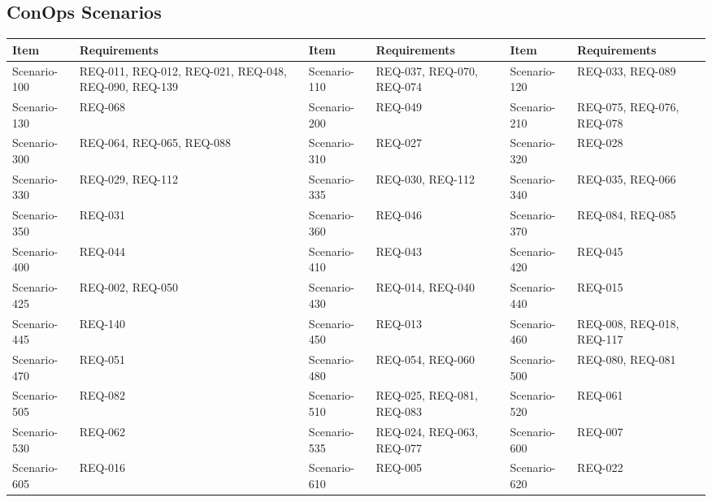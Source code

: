 \documentclass[11pt,a4paper]{article}
\begin{document}
\subsection{ConOps Scenarios}
{\footnotesize
\begin{longtable}{@{}>{\raggedright\arraybackslash}p{2.1cm}>{\raggedright\arraybackslash}p{2.5cm}>{\raggedright\arraybackslash}p{2.1cm}>{\raggedright\arraybackslash}p{2.5cm}>{\raggedright\arraybackslash}p{2.1cm}>{\raggedright\arraybackslash}p{2.5cm}@{}}
\toprule
Item & Requirements & Item & Requirements & Item & Requirements \\
\midrule
\endhead
Scenario-100 & REQ-011, REQ-012, REQ-021, REQ-048, REQ-090, REQ-139 & Scenario-110 & REQ-037, REQ-070, REQ-074 & Scenario-120 & REQ-033, REQ-089 \\
Scenario-130 & REQ-068 & Scenario-200 & REQ-049 & Scenario-210 & REQ-075, REQ-076, REQ-078 \\
Scenario-300 & REQ-064, REQ-065, REQ-088 & Scenario-310 & REQ-027 & Scenario-320 & REQ-028 \\
Scenario-330 & REQ-029, REQ-112 & Scenario-335 & REQ-030, REQ-112 & Scenario-340 & REQ-035, REQ-066 \\
Scenario-350 & REQ-031 & Scenario-360 & REQ-046 & Scenario-370 & REQ-084, REQ-085 \\
Scenario-400 & REQ-044 & Scenario-410 & REQ-043 & Scenario-420 & REQ-045 \\
Scenario-425 & REQ-002, REQ-050 & Scenario-430 & REQ-014, REQ-040 & Scenario-440 & REQ-015 \\
Scenario-445 & REQ-140 & Scenario-450 & REQ-013 & Scenario-460 & REQ-008, REQ-018, REQ-117 \\
Scenario-470 & REQ-051 & Scenario-480 & REQ-054, REQ-060 & Scenario-500 & REQ-080, REQ-081 \\
Scenario-505 & REQ-082 & Scenario-510 & REQ-025, REQ-081, REQ-083 & Scenario-520 & REQ-061 \\
Scenario-530 & REQ-062 & Scenario-535 & REQ-024, REQ-063, REQ-077 & Scenario-600 & REQ-007 \\
Scenario-605 & REQ-016 & Scenario-610 & REQ-005 & Scenario-620 & REQ-022 \\
\bottomrule
\end{longtable}}
\end{document}
